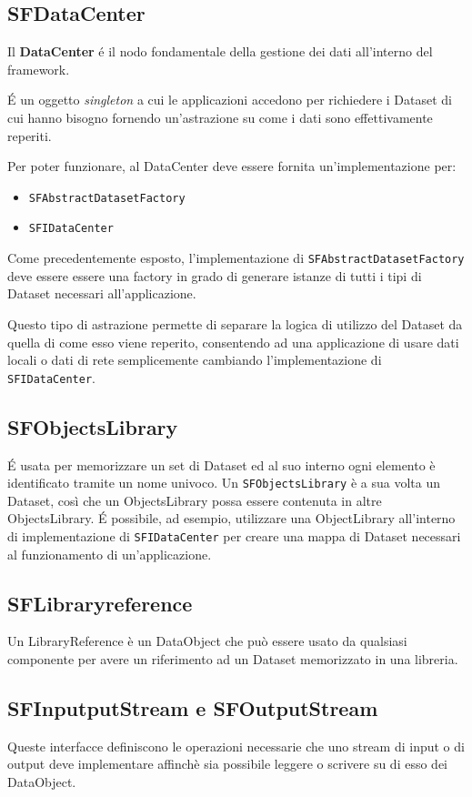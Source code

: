 \subsection{SFDataCenter}
\label{sub:sfdatacenter} 
Il \textbf{DataCenter} é il nodo fondamentale della gestione dei dati all'interno del framework. 

É un oggetto \textit{singleton} a cui le applicazioni accedono per richiedere i Dataset di cui hanno bisogno fornendo un'astrazione su come i dati sono effettivamente reperiti.

Per poter funzionare, al DataCenter deve essere fornita un'implementazione per:
\begin{itemize}
	\item \texttt{SFAbstractDatasetFactory}
	\item \texttt{SFIDataCenter}
\end{itemize}

Come precedentemente esposto, l'implementazione di \texttt{SFAbstractDatasetFactory} deve essere essere una factory in grado di generare istanze di tutti i tipi di Dataset necessari all'applicazione.

Questo tipo di astrazione permette di separare la logica di utilizzo del Dataset da quella di come esso viene reperito, consentendo ad una applicazione di usare dati locali o dati di rete semplicemente cambiando l'implementazione di \texttt{SFIDataCenter}.

\subsection{SFObjectsLibrary}
\label{sub:sfobjectslibrary}
É usata per memorizzare un set di Dataset ed al suo interno ogni elemento è identificato tramite un nome univoco.
Un \texttt{SFObjectsLibrary} è a sua volta un Dataset, così che un ObjectsLibrary possa essere contenuta in altre ObjectsLibrary.
É possibile, ad esempio, utilizzare una ObjectLibrary all'interno di implementazione di \texttt{SFIDataCenter} per creare una mappa di Dataset necessari al funzionamento di un'applicazione.

\subsection{SFLibraryreference}
\label{sub:sflibraryreference}
Un LibraryReference è un DataObject che può essere usato da qualsiasi componente per avere un riferimento ad un Dataset memorizzato in una libreria.

\subsection{SFInputputStream e SFOutputStream}
\label{sub:sfinoutstream}
Queste interfacce definiscono le operazioni necessarie che uno stream di input o di output deve implementare affinchè sia possibile leggere o scrivere su di esso dei DataObject.
